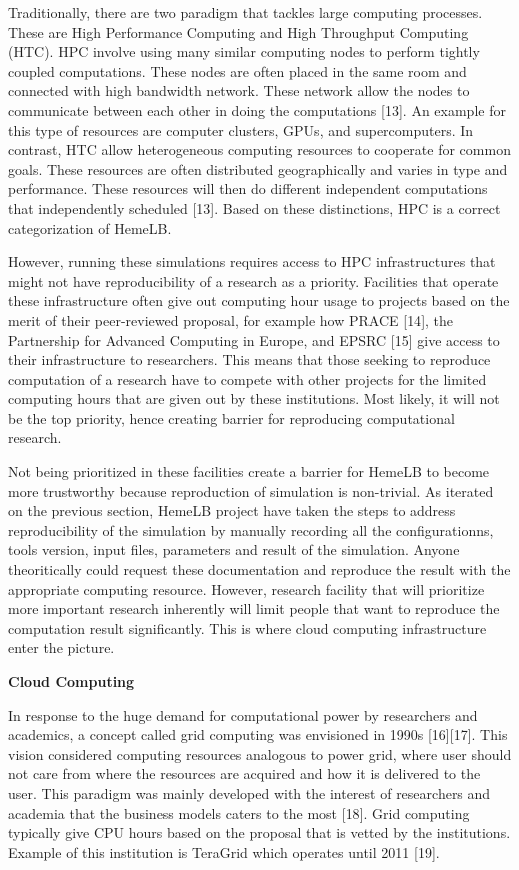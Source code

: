 \documentclass[]{article}
\begin{document}
Traditionally, there are two paradigm that tackles large computing
processes. These are High Performance Computing and High Throughput
Computing (HTC). HPC involve using many similar computing nodes to
perform tightly coupled computations. These nodes are often placed in
the same room and connected with high bandwidth network. These network
allow the nodes to communicate between each other in doing the
computations {[}13{]}. An example for this type of resources are
computer clusters, GPUs, and supercomputers. In contrast, HTC allow
heterogeneous computing resources to cooperate for common goals. These
resources are often distributed geographically and varies in type and
performance. These resources will then do different independent
computations that independently scheduled {[}13{]}. Based on these
distinctions, HPC is a correct categorization of HemeLB.

However, running these simulations requires access to HPC
infrastructures that might not have reproducibility of a research as a
priority. Facilities that operate these infrastructure often give out
computing hour usage to projects based on the merit of their
peer-reviewed proposal, for example how PRACE {[}14{]}, the Partnership
for Advanced Computing in Europe, and EPSRC {[}15{]} give access to
their infrastructure to researchers. This means that those seeking to
reproduce computation of a research have to compete with other projects
for the limited computing hours that are given out by these
institutions. Most likely, it will not be the top priority, hence
creating barrier for reproducing computational research.

Not being prioritized in these facilities create a barrier for HemeLB to
become more trustworthy because reproduction of simulation is
non-trivial. As iterated on the previous section, HemeLB project have
taken the steps to address reproducibility of the simulation by manually
recording all the configurationns, tools version, input files,
parameters and result of the simulation. Anyone theoritically could
request these documentation and reproduce the result with the
appropriate computing resource. However, research facility that will
prioritize more important research inherently will limit people that
want to reproduce the computation result significantly. This is where
cloud computing infrastructure enter the picture.

\textbf{Cloud Computing}

In response to the huge demand for computational power by researchers
and academics, a concept called grid computing was envisioned in 1990s
{[}16{]}{[}17{]}. This vision considered computing resources analogous
to power grid, where user should not care from where the resources are
acquired and how it is delivered to the user. This paradigm was mainly
developed with the interest of researchers and academia that the
business models caters to the most {[}18{]}. Grid computing typically
give CPU hours based on the proposal that is vetted by the institutions.
Example of this institution is TeraGrid which operates until 2011
{[}19{]}.
\end{document}
